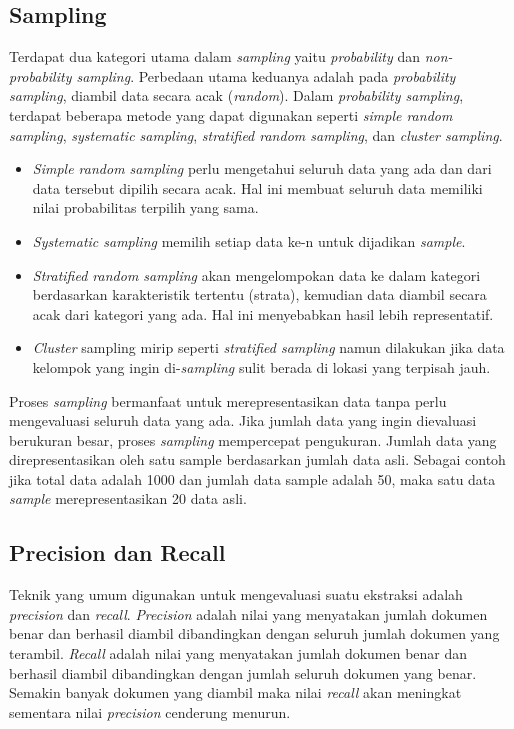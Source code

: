 \subsection{Sampling}
Terdapat dua kategori utama dalam \textit{sampling} yaitu \textit{probability} dan \textit{non-probability sampling}. Perbedaan utama keduanya adalah pada \textit{probability sampling}, diambil data secara acak (\textit{random}). Dalam \textit{probability sampling}, terdapat beberapa metode yang dapat digunakan seperti \textit{simple random sampling}, \textit{systematic sampling}, \textit{stratified random sampling}, dan \textit{cluster sampling}.
\begin{itemize}
  \item \textit{Simple random sampling} perlu mengetahui seluruh data yang ada dan dari data tersebut dipilih secara acak. Hal ini membuat seluruh data memiliki nilai probabilitas terpilih yang sama. 
  \item \textit{Systematic sampling} memilih setiap data ke-n untuk dijadikan \textit{sample}. 
  \item \textit{Stratified random sampling} akan mengelompokan data ke dalam kategori berdasarkan karakteristik tertentu (strata), kemudian data diambil secara acak dari kategori yang ada. Hal ini menyebabkan hasil lebih representatif. 
  \item \textit{Cluster} sampling mirip seperti \textit{stratified sampling} namun dilakukan jika data kelompok yang ingin di-\textit{sampling} sulit berada di lokasi yang terpisah jauh.
\end{itemize}
Proses \textit{sampling} bermanfaat untuk merepresentasikan data tanpa perlu mengevaluasi seluruh data yang ada. Jika jumlah data yang ingin dievaluasi berukuran besar, proses \textit{sampling} mempercepat pengukuran. Jumlah data yang direpresentasikan oleh satu sample berdasarkan jumlah data asli. Sebagai contoh jika total data adalah 1000 dan jumlah data sample adalah 50, maka satu data \textit{sample} merepresentasikan 20 data asli.

\subsection{Precision dan Recall}
Teknik yang umum digunakan untuk mengevaluasi suatu ekstraksi adalah \textit{precision} dan \textit{recall}. \textit{Precision} adalah nilai yang menyatakan jumlah dokumen benar dan berhasil diambil dibandingkan dengan seluruh jumlah dokumen yang terambil. \textit{Recall} adalah nilai yang menyatakan jumlah dokumen benar dan berhasil diambil dibandingkan dengan jumlah seluruh dokumen yang benar. Semakin banyak dokumen yang diambil maka nilai \textit{recall} akan meningkat sementara nilai \textit{precision} cenderung menurun. 

